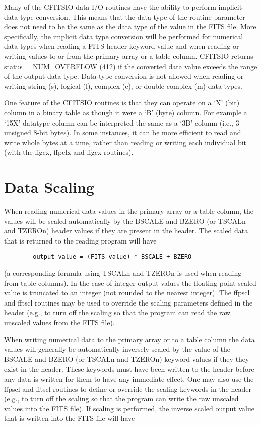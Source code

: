 Many of the CFITSIO data I/O routines have the ability to perform
implicit data type conversion.  This means that the data type of the
routine parameter does not need to be the same as the data type of the
value in the FITS file.  More specifically, the implicit data type
conversion will be performed for numerical data types when reading a
FITS header keyword value and when reading or writing values to or from
the primary array or a table column.  CFITSIO returns status =
NUM\_OVERFLOW (412) if the converted data value exceeds the range of
the output data type.  Data type conversion is not allowed when reading
or writing string (s), logical (l), complex (c), or double complex (m)
data types.

One feature of the CFITSIO routines is that they can operate on
a `X' (bit) column in a binary table as though it were a `B' (byte) column.
For example a `15X' datatype column can be interpreted the same
as a `3B' column (i.e., 3 unsigned 8-bit bytes).
In some instances, it can be more efficient to read and write whole
bytes at a time, rather than reading or writing each individual bit
(with the ffgcx, ffpclx and ffgcx routines).


\section{Data Scaling}

When reading numerical data values in the primary array or a
table column, the values will be scaled automatically by the BSCALE and
BZERO (or TSCALn and TZEROn) header values if they are
present in the header.  The scaled data that is returned to the reading
program will have

\begin{verbatim}
        output value = (FITS value) * BSCALE + BZERO
\end{verbatim}
(a corresponding formula using TSCALn and TZEROn is used when reading
from table columns).  In the case of integer output values the floating
point scaled value is truncated to an integer (not rounded to the
nearest integer).  The ffpscl and fftscl routines may be used to
override the scaling parameters defined in the header (e.g., to turn
off the scaling so that the program can read the raw unscaled values
from the FITS file).

When writing numerical data to the primary array or to a table
column the data values will generally be automatically inversely scaled
by the value of the BSCALE and BZERO (or TSCALn and TZEROn)
keyword values if they they exist in the header.  These keywords must
have been written to the header before any data is written for them to
have any immediate effect.  One may also use the ffpscl and fftscl
routines to define or override the scaling keywords in the header
(e.g., to turn off the scaling so that the program can write the raw
unscaled values into the FITS file). If scaling is performed, the
inverse scaled output value that is written into the FITS file will
have

